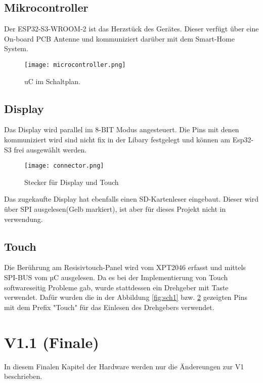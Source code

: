         \subsection{Mikrocontroller}
        Der ESP32-S3-WROOM-2 ist das Herzstück des Gerätes. Dieser verfügt über eine On-board PCB Antenne
        und kommuniziert darüber mit dem Smart-Home System. 

            \begin{figure}[h!]
                \centering
                \texttt{[image: microcontroller.png]}
                \caption{uC im Schaltplan.}
                \label{fig:sch3}

            \end{figure}

        \subsection{Display}
        Das Display wird parallel im 8-BIT Modus angesteuert. Die Pins mit denen 
        kommuniziert wird sind nicht fix in der Libary festgelegt und können am Esp32-S3 
        frei ausgewählt werden. 

            \begin{figure}[h!]
                \centering
                \texttt{[image: connector.png]}
                \caption{Stecker für Display und Touch}
                \label{fig:sch4}

            \end{figure}

        Das zugekaufte Display hat ebenfalls einen SD-Kartenleser eingebaut. Dieser wird 
        über SPI ausgelesen(Gelb markiert), ist aber für dieses Projekt nicht in verwendung. 


        \subsection{Touch}
        Die Berührung am Resisivtouch-Panel wird vom XPT2046 erfasst und mittels 
        SPI-BUS vom µC ausgelesen. Da es bei der Implementierung von Touch softwareseitig
        Probleme gab, wurde stattdessen ein Drehgeber mit Taste verwendet.
        Dafür wurden die in der Abbildung \ref{fig:sch1} bzw. \ref{fig:sch4} gezeigten Pins mit 
        dem Prefix "Touch" für das Einlesen des Drehgebers verwendet.

 
    \newpage
    \section{V1.1 (Finale)}       
    In diesem Finalen Kapitel der Hardware werden nur die Ändereungen zur V1 beschrieben. 

